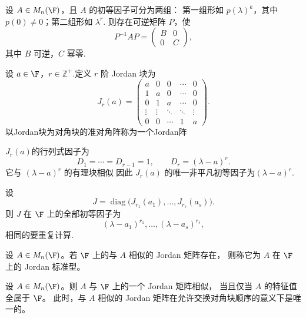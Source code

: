 \begin{example}
	设 $A\in M_n(\F)$，且 $A$ 的初等因子可分为两组：
	第一组形如 $p(\lambda)^k$，其中 $p(0)\neq0$；第二组形如 $\lambda^r$.
	则存在可逆矩阵 $P$，使
	\[
	P^{-1}AP=
	\begin{pmatrix}
		B&0\\
		0&C
	\end{pmatrix},
	\]
	其中 $B$ 可逆，$C$ 幂零.
\end{example}


\begin{definition}
	设 $a\in\F$，$r\in\mathbb{Z}^+$.定义 $r$ 阶 Jordan 块为
	\[
	J_r(a)=
	\begin{pmatrix}
		a&0&0&\cdots&0\\
		1&a&0&\cdots&0\\
		0&1&a&\cdots&0\\
		\vdots&\vdots&\ddots&\ddots&\vdots\\
		0&0&\cdots&1&a
	\end{pmatrix}.
	\]
	以Jordan块为对角块的准对角阵称为一个Jordan阵
\end{definition}
$J_r(a)$的行列式因子为
\[
D_1=\cdots=D_{r-1}=1,\qquad
D_r=(\lambda-a)^r.
\]
它与 $(\lambda-a)^r$ 的有理块相似
因此 $J_r(a)$ 的唯一非平凡初等因子为$(\lambda-a)^r.$


\begin{lemma}
	设
	\[
	J=\operatorname{diag}
	\bigl(
	J_{r_1}(a_1),\ldots,J_{r_s}(a_s)
	\bigr).
	\]
	则 $J$ 在 $\F$ 上的全部初等因子为
	\[
	(\lambda-a_1)^{r_1},\ldots,(\lambda-a_s)^{r_s},
	\]
	相同的要重复计算.
\end{lemma}


\begin{definition}
	设 $A\in M_n(\F)$。若 $\F$ 上的与 $A$ 相似的 Jordan 矩阵存在，
	则称它为 $A$ 在 $\F$ 上的 Jordan 标准型。
\end{definition}

\begin{theorem}
	设 $A\in M_n(\F)$。则 $A$ 与 $\F$ 上的一个 Jordan 矩阵相似，
	当且仅当 $A$ 的特征值全属于 $\F$。
	此时，与 $A$ 相似的 Jordan 矩阵在允许交换对角块顺序的意义下是唯一的。
\end{theorem}

